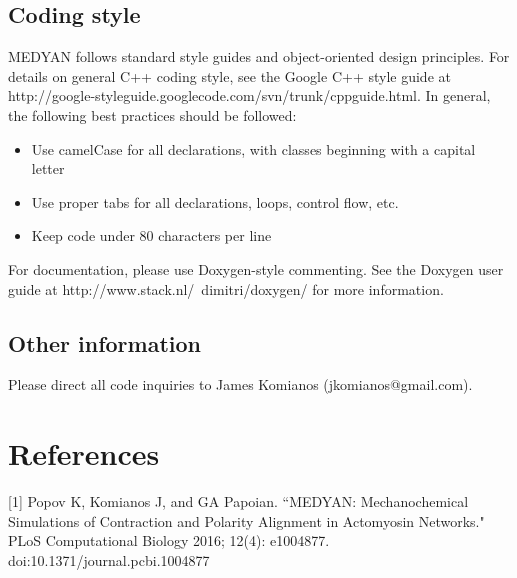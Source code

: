 \documentclass[11pt, oneside]{article}   	%
\begin{document}
\subsection{Coding style}

MEDYAN follows standard style guides and object-oriented design principles. For details on general C++ coding style, see the Google C++ style guide at http://google-styleguide.googlecode.com/svn/trunk/cppguide.html. In general, the following best practices should be followed:

\begin{itemize}

\item Use camelCase for all declarations, with classes beginning with a capital letter
\item Use proper tabs for all declarations, loops, control flow, etc.
\item Keep code under 80 characters per line

\end{itemize}

\noindent For documentation, please use Doxygen-style commenting. See the Doxygen user guide at 
http://www.stack.nl/~dimitri/doxygen/ for more information.

\subsection{Other information}

Please direct all code inquiries to James Komianos (jkomianos@gmail.com).

\section{References}

[1] Popov K, Komianos J, and GA Papoian. ``MEDYAN: Mechanochemical Simulations 
\indent of Contraction and Polarity Alignment in Actomyosin Networks." PLoS Computational \indent Biology 2016; 12(4): e1004877. doi:10.1371/journal.pcbi.1004877
\end{document}
